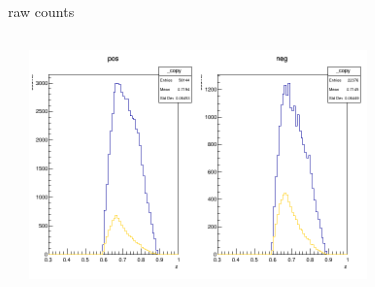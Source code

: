 \begin{frame}{raw counts}
\begin{columns}
\begin{column}[T]{0.5\textwidth}
\end{column}
\begin{column}[T]{0.5\textwidth}
\includegraphics[width = 0.7\textwidth]{results/yield/statistics/counts_x_Q2_z_0.35_4.000_0.70.png}
\end{column}
\end{columns}
\end{frame}
